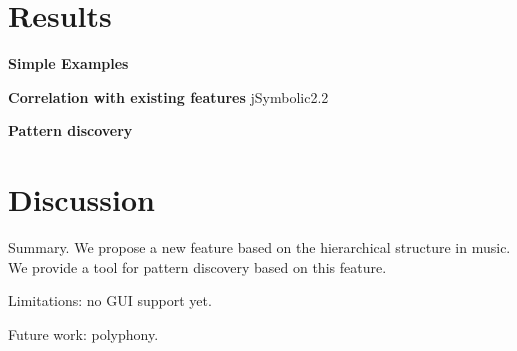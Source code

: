\section{Results}

\textbf{Simple Examples}

\textbf{Correlation with existing features} jSymbolic2.2

\textbf{Pattern discovery}

\section{Discussion}
 
Summary. We propose a new feature based on the hierarchical structure in music. We provide a tool for pattern discovery based on this feature.

Limitations: no GUI support yet. 

Future work: polyphony. 

